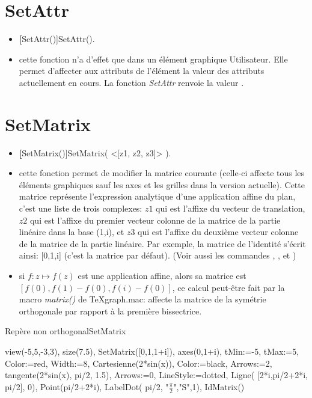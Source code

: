 \section{SetAttr}\label{cmdSetAttr}

\begin{itemize}
 \item \util \textbf[SetAttr()]{SetAttr()}.
 \item \desc cette fonction n'a d'effet que dans un élément graphique Utilisateur. Elle permet d'affecter aux attributs de l'élément la valeur des attributs actuellement en cours. La fonction \textsl{SetAttr} renvoie la valeur \Nil.
\end{itemize} 

\section{SetMatrix}\label{cmdSetMatrix}

\begin{itemize}
 \item \util \textbf[SetMatrix()]{SetMatrix( <[z1, z2, z3]> )}.
 \item \desc cette fonction permet de modifier la matrice courante (celle-ci affecte tous les éléments graphiques sauf les axes et les grilles dans la version actuelle). Cette matrice représente l'expression analytique d'une application affine du plan, c'est une liste de trois complexes: $z1$ qui est l'affixe du vecteur de translation, $z2$ qui est l'affixe du premier vecteur colonne de la matrice de la partie linéaire dans la base (1,i), et $z3$ qui est l'affixe du deuxième vecteur colonne de la matrice de la partie linéaire. Par exemple, la matrice de l'identité s'écrit ainsi: [0,1,i] (c'est la matrice par défaut). (Voir aussi les commandes , , et )
 \item \exem si $f:z \mapsto f(z)$ est une application affine, alors sa matrice est $[f(0), f(1)-f(0), f(i)-f(0)]$, ce calcul peut-être fait par la macro \textit{matrix()} de TeXgraph.mac:  affecte la matrice de la symétrie orthogonale par rapport à la première bissectrice.
\end{itemize}


\begin{demo}{Repère non orthogonal}{SetMatrix}
\begin{texgraph}[name=SetMatrix]
view(-5,5,-3,3), size(7.5),
SetMatrix([0,1,1+i]), axes(0,1+i),
tMin:=-5, tMax:=5,
Color:=red, Width:=8, Cartesienne(2*sin(x)),
Color:=black, Arrows:=2,
tangente(2*sin(x), pi/2, 1.5),
Arrows:=0, LineStyle:=dotted,
Ligne( [2*i,pi/2+2*i, pi/2], 0),
Point(pi/2+2*i),
LabelDot( pi/2, "$\frac{\pi}2$","S",1),
IdMatrix()
\end{texgraph}
\end{demo}


